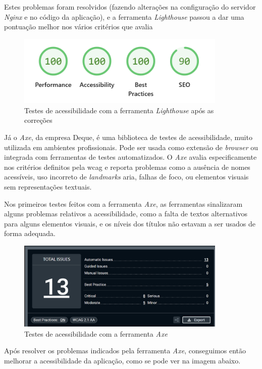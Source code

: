 Estes problemas foram resolvidos (fazendo alterações na configuração do servidor \textit{Nginx} e no código da aplicação), e a ferramenta \textit{Lighthouse} passou a dar uma pontuação melhor nos vários critérios que avalia

\begin{figure}[H]
\centering
\includegraphics[max width=10cm]{./img/lh_after}
\caption{Testes de acessibilidade com a ferramenta \textit{Lighthouse} após as correções}
\end{figure}

Já o \textit{Axe}, da empresa Deque, é uma biblioteca de testes de acessibilidade, muito utilizada em ambientes profissionais. Pode ser usada como extensão de \textit{browser} ou integrada com ferramentas de testes automatizados. O \textit{Axe} avalia especificamente nos critérios definitos pela \gls{wcag} e reporta problemas como a ausência de nomes acessíveis, uso incorreto de \textit{landmarks} \gls{aria}, falhas de foco, ou elementos visuais sem representações textuais.

Nos primeiros testes feitos com a ferramenta \textit{Axe}, as ferramentas sinalizaram alguns problemas relativos a acessibilidade, como a falta de textos alternativos para alguns elementos visuais, e os níveis dos títulos não estavam a ser usados de forma adequada.

\begin{figure}[H]
    \centering
    \includegraphics[max width=10cm]{./img/axe}
    \caption{Testes de acessibilidade com a ferramenta \textit{Axe}}
    \end{figure}


Após resolver os problemas indicados pela ferramenta \textit{Axe}, conseguimos então melhorar a acessibilidade da aplicação, como se pode ver na imagem abaixo.

